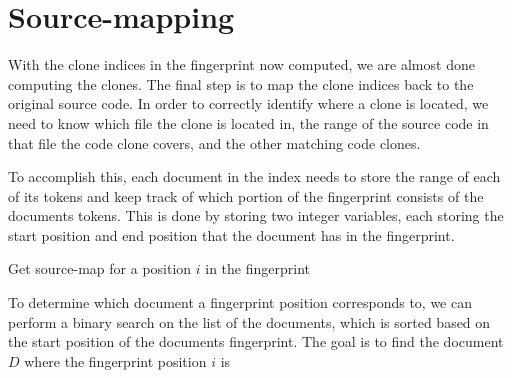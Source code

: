 \section{Source-mapping}

With the clone indices in the fingerprint now computed, we are almost done computing the
clones. The final step is to map the clone indices back to the original source code. In
order to correctly identify where a clone is located, we need to know which file the clone
is located in, the range of the source code in that file the code clone covers, and the
other matching code clones.

To accomplish this, each document in the index needs to store the range of each of its
tokens and keep track of which portion of the fingerprint consists of the documents
tokens. This is done by storing two integer variables, each storing the start position and
end position that the document has in the fingerprint. 

\begin{algorithm}[htp!]
  \SetAlgoLined\DontPrintSemicolon

  \vspace{0.5cm}
  \caption{Get source-map for a position $i$ in the fingerprint}
  \label{alg:sourcemap}
\end{algorithm}

To determine which document a fingerprint position corresponds to, we can perform a binary
search on the list of the documents, which is sorted based on the start position of the
documents fingerprint. The goal is to find the document $D$ where the fingerprint position $i$
is 

